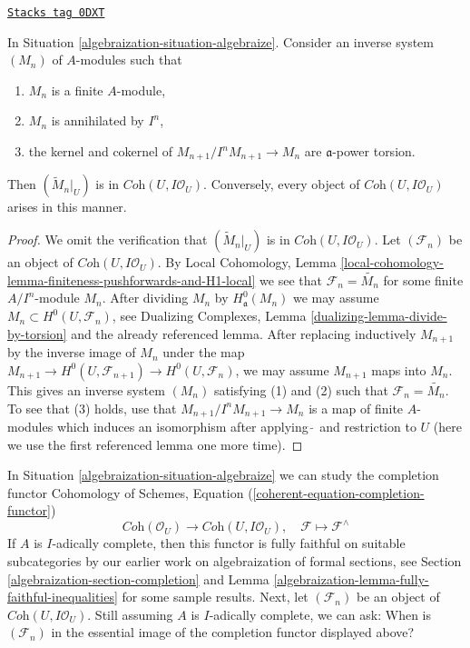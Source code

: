 \begin{lemma}
\label{algebraization-lemma-system-of-modules}
\href{https://stacks.math.columbia.edu/tag/0DXT}{\texttt{Stacks tag 0DXT}}

In Situation \ref{algebraization-situation-algebraize}.
Consider an inverse system $(M_n)$ of $A$-modules such
that
\begin{enumerate}
\item $M_n$ is a finite $A$-module,
\item $M_n$ is annihilated by $I^n$,
\item the kernel and cokernel of $M_{n + 1}/I^nM_{n + 1} \to M_n$
are $\mathfrak a$-power torsion.
\end{enumerate}
Then $(\widetilde{M}_n|_U)$ is in $\textit{Coh}(U, I\mathcal{O}_U)$.
Conversely, every object of $\textit{Coh}(U, I\mathcal{O}_U)$
arises in this manner.
\end{lemma}

\begin{proof}
We omit the verification that $(\widetilde{M}_n|_U)$ is in
$\textit{Coh}(U, I\mathcal{O}_U)$. Let $(\mathcal{F}_n)$
be an object of $\textit{Coh}(U, I\mathcal{O}_U)$.
By Local Cohomology, Lemma
\ref{local-cohomology-lemma-finiteness-pushforwards-and-H1-local}
we see that $\mathcal{F}_n = \widetilde{M_n}$ for some finite
$A/I^n$-module $M_n$. After dividing $M_n$ by $H^0_\mathfrak a(M_n)$
we may assume $M_n \subset H^0(U, \mathcal{F}_n)$, see
Dualizing Complexes, Lemma \ref{dualizing-lemma-divide-by-torsion}
and the already referenced lemma.
After replacing inductively $M_{n + 1}$ by the inverse image
of $M_n$ under the map $M_{n + 1} \to H^0(U, \mathcal{F}_{n + 1})
\to H^0(U, \mathcal{F}_n)$, we may assume $M_{n + 1}$ maps into
$M_n$. This gives an inverse system $(M_n)$ satisfying (1) and (2)
such that $\mathcal{F}_n = \widetilde{M_n}$. To see that (3)
holds, use that $M_{n + 1}/I^nM_{n + 1} \to M_n$ is a map
of finite $A$-modules which induces an isomorphism after
applying $\widetilde{\ }$ and restriction to $U$
(here we use the first referenced lemma one more time).
\end{proof}

In Situation \ref{algebraization-situation-algebraize} we can study the completion functor
Cohomology of Schemes, Equation (\ref{coherent-equation-completion-functor})
\begin{equation}
\label{equation-completion}
\textit{Coh}(\mathcal{O}_U)
\longrightarrow
\textit{Coh}(U, I\mathcal{O}_U),\quad
\mathcal{F} \longmapsto \mathcal{F}^\wedge
\end{equation}
If $A$ is $I$-adically complete, then this functor is fully faithful
on suitable subcategories by our earlier work on algebraization of
formal sections, see Section \ref{algebraization-section-completion} and
Lemma \ref{algebraization-lemma-fully-faithful-inequalities} for some sample results.
Next, let $(\mathcal{F}_n)$ be an object of $\textit{Coh}(U, I\mathcal{O}_U)$.
Still assuming $A$ is $I$-adically complete, we can ask:
When is $(\mathcal{F}_n)$ in the essential image of the completion
functor displayed above?

